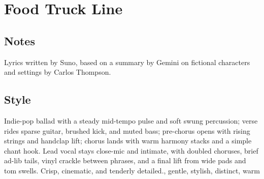 \section{Food Truck Line}

\subsection{Notes}
Lyrics written by Suno, based on a summary by Gemini on fictional characters and settings by Carlos Thompson.

\subsection{Style}
Indie-pop ballad with a steady mid-tempo pulse and soft swung percussion; verse rides sparse guitar, brushed kick, and muted bass; pre-chorus opens with rising strings and handclap lift; chorus lands with warm harmony stacks and a simple chant hook. Lead vocal stays close-mic and intimate, with doubled choruses, brief ad-lib tails, vinyl crackle between phrases, and a final lift from wide pads and tom swells. Crisp, cinematic, and tenderly detailed., gentle, stylish, distinct, warm

